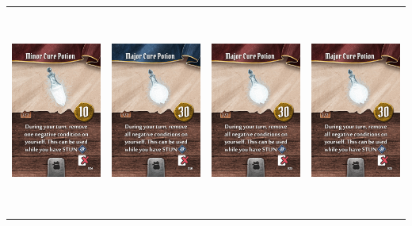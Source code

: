 \documentclass{minimal}
\begin{document}
{\begin{longtable}{llll}
\includegraphics[width=44mm,height=68mm]{./64-151/gh-089b-minor-cure-potion.png} &
\includegraphics[width=44mm,height=68mm]{./64-151/gh-090a-major-cure-potion.png} &
\includegraphics[width=44mm,height=68mm]{./64-151/gh-090b-major-cure-potion.png} &
\includegraphics[width=44mm,height=68mm]{./64-151/gh-090b-major-cure-potion.png}\\ 

\end{longtable}}
\end{document}
